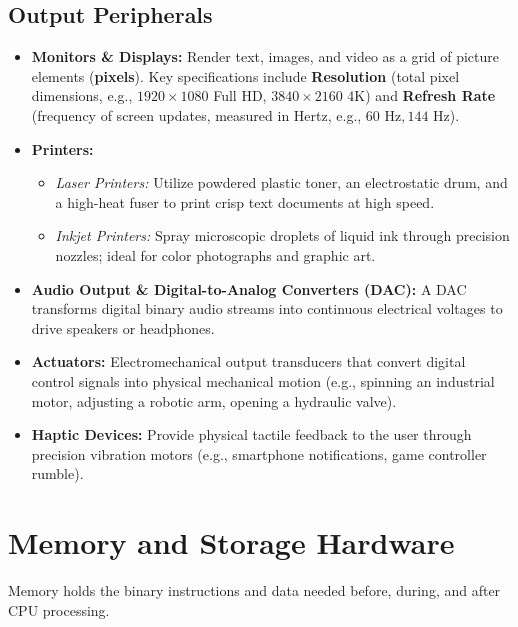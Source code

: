 \subsection{Output Peripherals}
\begin{itemize}[leftmargin=1.2em]
    \item \textbf{Monitors \& Displays:} Render text, images, and video as a grid of picture elements (\textbf{pixels}). Key specifications include \textbf{Resolution} (total pixel dimensions, e.g., $1920 \times 1080$ Full HD, $3840 \times 2160$ 4K) and \textbf{Refresh Rate} (frequency of screen updates, measured in Hertz, e.g., $60\text{ Hz}, 144\text{ Hz}$).
    \item \textbf{Printers:}
    \begin{itemize}
        \item \textit{Laser Printers:} Utilize powdered plastic toner, an electrostatic drum, and a high-heat fuser to print crisp text documents at high speed.
        \item \textit{Inkjet Printers:} Spray microscopic droplets of liquid ink through precision nozzles; ideal for color photographs and graphic art.
    \end{itemize}
    \item \textbf{Audio Output \& Digital-to-Analog Converters (DAC):} A DAC transforms digital binary audio streams into continuous electrical voltages to drive speakers or headphones.
    \item \textbf{Actuators:} Electromechanical output transducers that convert digital control signals into physical mechanical motion (e.g., spinning an industrial motor, adjusting a robotic arm, opening a hydraulic valve).
    \item \textbf{Haptic Devices:} Provide physical tactile feedback to the user through precision vibration motors (e.g., smartphone notifications, game controller rumble).
\end{itemize}

\section{Memory and Storage Hardware}

Memory holds the binary instructions and data needed before, during, and after CPU processing.


